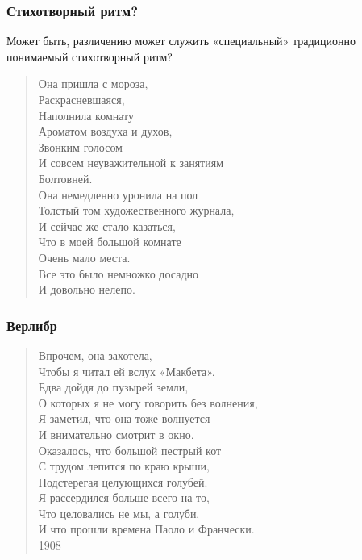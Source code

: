\documentclass{beamer}
\begin{document}

\begin{frame}
\frametitle{Стихотворный ритм?}
\begin{flushleft}
Может быть, различению может служить «специальный» традиционно понимаемый стихотворный ритм?
\end{flushleft}

\begin{verse}
Она пришла с мороза,\\
Раскрасневшаяся,\\
Наполнила комнату\\
Ароматом воздуха и духов,\\
Звонким голосом\\
И совсем неуважительной к занятиям\\
Болтовней.\\
Она немедленно уронила на пол\\
Толстый том художественного журнала,\\
И сейчас же стало казаться,\\
Что в моей большой комнате\\
Очень мало места.\\
Все это было немножко досадно\\
И довольно нелепо.
\end{verse}

\end{frame}


\begin{frame}
\frametitle{Верлибр}

\begin{verse}
Впрочем, она захотела,\\
Чтобы я читал ей вслух «Макбета».\\
Едва дойдя до пузырей земли,\\
О которых я не могу говорить без волнения,\\
Я заметил, что она тоже волнуется\\
И внимательно смотрит в окно.\\
Оказалось, что большой пестрый кот\\
С трудом лепится по краю крыши,\\
Подстерегая целующихся голубей.\\
Я рассердился больше всего на то,\\
Что целовались не мы, а голуби,\\
И что прошли времена Паоло и Франчески.\\

1908
\end{verse}

\end{frame}
\end{document}
